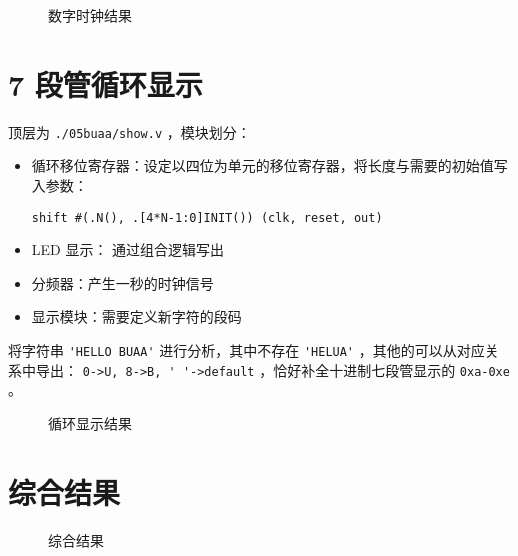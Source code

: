 \documentclass[lang=cn,11pt,a4paper,cite=authoryear]{elegantpaper}
\begin{document}
\begin{figure}
    \centering
    \caption{数字时钟结果}\label{04} 
     \hfill 
     \hfill
     \hfill 
     \bigskip 
\end{figure}

\section{7 段管循环显示}

顶层为 \lstinline{./05buaa/show.v} ，模块划分：

\begin{itemize}
    \item 循环移位寄存器：设定以四位为单元的移位寄存器，将长度与需要的初始值写入参数：

    \lstinline{shift #(.N(), .[4*N-1:0]INIT()) (clk, reset, out)} 
    \item LED 显示： 通过组合逻辑写出
    \item 分频器：产生一秒的时钟信号
    \item 显示模块：需要定义新字符的段码
\end{itemize}

将字符串 \lstinline{'HELLO BUAA'} 进行分析，其中不存在 \lstinline{'HELUA'} ，其他的可以从对应关系中导出： \lstinline{0->U, 8->B, ' '->default} ，恰好补全十进制七段管显示的 \lstinline{0xa-0xe} 。

\begin{figure}
    \centering
    \caption{循环显示结果}\label{05} 
     \hfill 
     \hfill 
     \hfill 
    
    \bigskip

     \hfill 
     \hfill 
     \hfill 
    
    \bigskip  
    
     \hfill 
     \hfill 
     \hfill 
\end{figure}

\section{综合结果}

\begin{figure}
    \centering
    \caption{综合结果}\label{05} 
     \hfill 
     \hfill 
     \hfill 
     \hfill
\end{figure}
\end{document}
